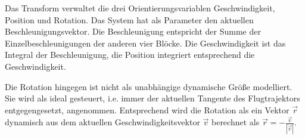 \label{transform}
Das Transform verwaltet die drei Orientierungsvariablen Geschwindigkeit, Position und Rotation. Das System hat als Parameter den aktuellen Beschleunigungsvektor. Die Beschleunigung entspricht der Summe der Einzelbeschleunigungen der anderen vier Blöcke. Die Geschwindigkeit ist das Integral der Beschleunigung, die Position integriert entsprechend die Geschwindigkeit.

Die Rotation hingegen ist nicht als unabhängige dynamische Größe modelliert. Sie wird als ideal gesteuert, i.e. immer der aktuellen Tangente des Flugtrajektors entgegengesetzt, angenommen. Entsprechend wird die Rotation als ein Vektor $\vec r$ dynamisch aus dem aktuellen Geschwindigkeitsvektor $\vec v$ berechnet als $\vec r = -\frac{\vec v}{|\vec v|}$.\\ \\